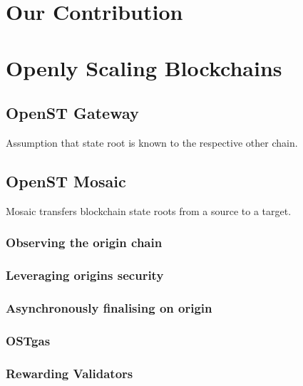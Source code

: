 \documentclass[12pt,a4paper,draft]{article}
\begin{document}
\section{Our Contribution}

\section{Openly Scaling Blockchains}

\subsection{OpenST Gateway}

Assumption that state root is known to the respective other chain.

\subsection{OpenST Mosaic}

Mosaic transfers blockchain state roots from a source to a target.

%

\subsubsection{Observing the origin chain}

\subsubsection{Leveraging origins security}

\subsubsection{Asynchronously finalising on origin}

\subsubsection{OSTgas}

\subsubsection{Rewarding Validators}
\end{document}
